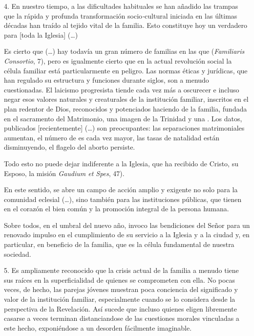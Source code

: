 \begin{body}
\begin{body}
		4. En nuestro tiempo, a las dificultades habituales se han añadido las trampas que la rápida y profunda transformación socio\emph{-}cultural iniciada en las últimas décadas han traído al tejido vital de la familia. Esto constituye hoy un verdadero  para {[}toda la Iglesia{]} (\ldots{})

		Es cierto que (\ldots{}) hay todavía un gran número de familias en las que  (\emph{Familiaris Consortio}, 7), pero es igualmente cierto que en la actual revolución social la célula familiar está particularmente en peligro. Las normas éticas y jurídicas, que han regulado su estructura y funciones durante siglos, son a menudo cuestionadas. El laicismo progresista tiende cada vez más a oscurecer e incluso negar esos valores naturales y creaturales de la institución familiar, inscritos en el plan redentor de Dios, reconocidos y potenciados haciendo de la familia, fundada en el sacramento del Matrimonio, una imagen de la Trinidad y una . Los datos, publicados {[}recientemente{]} (\ldots{}) son preocupantes: las separaciones matrimoniales aumentan, el número de  es cada vez mayor, las tasas de natalidad están disminuyendo, el flagelo del aborto persiste.

		Todo esto no puede dejar indiferente a la Iglesia, que ha recibido de Cristo, su Esposo, la misión  \emph{Gaudium et Spes}, 47).

		En este sentido, se abre un campo de acción amplio y exigente no solo para la comunidad eclesial (\ldots{}), sino también para las instituciones públicas, que tienen en el corazón el bien común y la promoción integral de la persona humana.

		Sobre todos, en el umbral del nuevo año, invoco las bendiciones del Señor para un renovado impulso en el cumplimiento de su servicio a la Iglesia y a la ciudad y, en particular, en beneficio de la familia, que es la célula fundamental de nuestra sociedad.

		5. Es ampliamente reconocido que la crisis actual de la familia a menudo tiene sus raíces en la superficialidad de quienes se comprometen con ella. No pocas veces, de hecho, las parejas jóvenes muestran poca conciencia del significado y valor de la institución familiar, especialmente cuando se lo considera desde la perspectiva de la Revelación. Así sucede que incluso quienes eligen libremente casarse  a veces terminan distanciandose de las cuestiones morales vinculadas a este hecho, exponiéndose a un desorden fácilmente imaginable.


\end{body}
\end{body}
